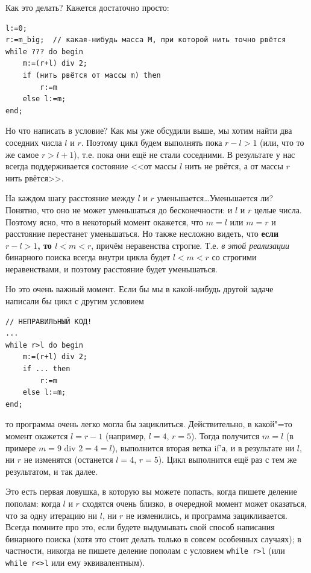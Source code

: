 \documentclass[a4paper,10pt]{problems}
\begin{document}
Как это делать? Кажется достаточно просто:
\begin{codesampleo}\begin{verbatim}
l:=0;
r:=m_big;  // какая-нибудь масса M, при которой нить точно рвётся
while ??? do begin    
    m:=(r+l) div 2;
    if (нить рвётся от массы m) then
        r:=m
    else l:=m;
end;
\end{verbatim}
\end{codesampleo}
Но что написать в условие? 
Как мы уже обсудили выше, мы хотим найти два соседних числа $l$ и $r$. 
Поэтому цикл будем выполнять пока $r-l>1$ (или, что то же самое $r>l+1$), т.е. пока они ещё не стали соседними.
В результате у нас всегда поддерживается состояние <<от массы $l$ нить не рвётся, а от массы $r$ нить рвётся>>.

На каждом шагу расстояние между $l$ и $r$ уменьшается\dots Уменьшается ли?
Понятно, что оно не может уменьшаться до бесконечности: и $l$ и $r$ целые числа.
Поэтому ясно, что в некоторый момент окажется, что $m=l$ или $m=r$ и расстояние перестанет уменьшаться.
Но также несложно видеть, что \textbf{если $r-l>1$, то $l<m<r$}, причём неравенства строгие. 
Т.е. \textit{в этой реализации} бинарного поиска всегда внутри цикла будет $l<m<r$ со строгими неравенствами,
и поэтому расстояние будет уменьшаться.

Но это очень важный момент. Если бы мы в какой-нибудь другой задаче написали бы цикл с другим условием
\begin{codesampleo}\begin{verbatim}
// НЕПРАВИЛЬНЫЙ КОД!
...
while r>l do begin    
    m:=(r+l) div 2;
    if ... then
        r:=m
    else l:=m;
end;
\end{verbatim}
\end{codesampleo}
то программа очень легко могла бы зациклиться. Действительно, в какой"=то момент окажется $l=r-1$ (например, $l=4$, $r=5$).
Тогда получится $m=l$ (в примере $m=9\mbox{ div } 2=4=l$), выполнится вторая ветка if'а, и в результате ни $l$, ни $r$ не изменятся
(останется $l=4$, $r=5$). Цикл выполнится ещё раз с тем же результатом, и так далее.

Это есть первая ловушка, в которую вы можете попасть, когда пишете деление пополам: когда $l$ и $r$ сходятся очень близко, 
в очередной момент может оказаться, что за одну итерацию ни $l$, ни $r$ не изменились, и программа зацикливается.
Всегда помните про это, если будете выдумывать свой способ написания бинарного поиска (хотя это стоит делать только в совсем особенных случаях);
в частности, никогда не пишете деление пополам с условием \verb`while r>l` (или \verb`while r<>l` или ему эквивалентным).
\end{document}

